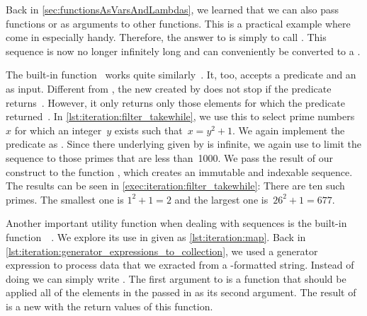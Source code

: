 Back in \cref{sec:functionsAsVarsAndLambdas}, we learned that we can also pass functions or  as arguments to other functions.
This is a practical example where  come in especially handy.
Therefore, the answer to  is simply to call .
This sequence is now no longer infinitely long and can conveniently be converted to a .

The built-in function~ works quite similarly~\cite{PSF:P3D:TPSL:BIF}.
It, too, accepts a predicate and an~ as input.
Different from , the new  created by  does not stop if the predicate returns~.
However, it only returns only those elements for which the predicate returned~.
In \cref{lst:iteration:filter_takewhile}, we use this to select prime numbers~$x$ for which an integer~$y$ exists such that~$x=y^2+1$.
We again implement the predicate as .
Since there underlying  given by  is infinite, we again use  to limit the sequence to those primes that are less than~1000.
We pass the result of our construct to the function , which creates an immutable and indexable sequence.
The results can be seen in \cref{exec:iteration:filter_takewhile}:
There are ten such primes.
The smallest one is $1^2+1=2$ and the largest one is~$26^2+1=677$.

%
%
%
Another important utility function when dealing with sequences is the built-in function~~\cite{PSF:P3D:TPSL:BIF}.
We explore its use in  given as \cref{lst:iteration:map}.
Back in \cref{lst:iteration:generator_expressions_to_collection}, we used a generator expression to process data that we exracted from a -formatted string.
Instead of doing  we can simply write .
The first argument to  is a function that should be applied all of the elements in the  passed in as its second argument.
The result of  is a new  with the return values of this function.

